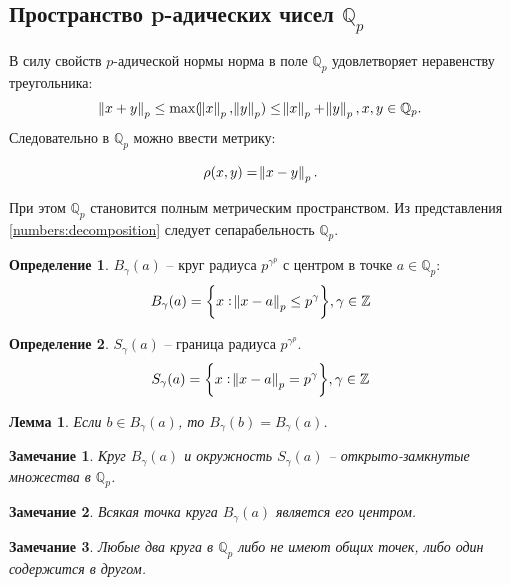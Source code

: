 \documentclass[och, master]{SCWorks}
\theoremstyle{plain}
\theoremstyle{plain}
\newtheorem{lemma}{Лемма}
\theoremstyle{plain}
\newtheorem{note}{Замечание}
\theoremstyle{definition}
\newtheorem{defn}{Определение}
\begin{document}
\subsection{Пространство p-адических чисел $\mathbb {Q}_p$}
В силу свойств $p$-адической нормы норма в поле $\mathbb {Q}_p$ удовлетворяет неравенству треугольника:
$$\norm{x + y}_p \le \max(\norm{x}_p, \norm{y}_p) \le \norm{x}_p + \norm{y}_p, x,y \in \mathbb {Q}_p.$$
\noindent Следовательно в $\mathbb {Q}_p$ можно ввести метрику:

\begin{equation}
	\rho (x,y)=\norm{x-y}_p.
\end{equation}

\noindent При этом $\mathbb {Q}_p$ становится полным метрическим пространством. Из представления \eqref{numbers:decomposition} следует сепарабельность $\mathbb {Q}_p$.  

\begin{defn}
$B_{\gamma}(a)$ -- круг радиуса $p^{\gamma^p}$ с центром в точке $a \in \mathbb {Q}_p$:
\begin{equation}
	B_\gamma(a) = \bigg\{x: \norm{x-a}_p \le p^{\gamma} \bigg\}, \gamma \in \mathbb {Z}
\end{equation}
\end{defn}

\begin{defn}
$S_{\gamma}(a)$ -- граница радиуса $p^{\gamma^p}$.
\begin{equation}
	S_\gamma(a) = \bigg\{x: \norm{x-a}_p = p^{\gamma} \bigg\}, \gamma \in \mathbb {Z}
\end{equation}
\end{defn}

\begin{lemma}
Если $b \in B_{\gamma}(a)$, то $B_{\gamma}(b)=B_{\gamma}(a)$.
\end{lemma}

\begin{note}
Круг $B_{\gamma}(a)$ и окружность $S_{\gamma}(a)$ -- открыто-замкнутые множества в $\mathbb {Q}_p$.
\end{note}

\begin{note}
Всякая точка круга $B_{\gamma}(a)$ является его центром.
\end{note}

\begin{note}
Любые два круга в $\mathbb {Q}_p$ либо не имеют общих точек, либо один содержится в другом.
\end{note}
\end{document}
